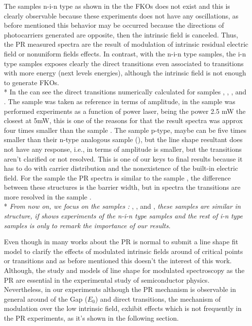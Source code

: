 The samples n-i-n type as shown in the  the FKOs does not exist and this is clearly observable because these experiments does not have any oscillations, as before mentioned this behavior may be occurred because the directions  of photocarriers generated are opposite, then the intrinsic field is canceled. Thus, the PR measured spectra are the result of modulation of intrinsic residual electric field or  nonuniform fields effects\cite{delsole1978effect}.  
In contrast,  with the n-i-n type samples, the i-n type samples exposes clearly the direct transitions even associated to transitions with more energy (next levels energies), although the intrinsic field is not enough to generate FKOs. \\*
In the  can see the direct transitions numerically calculated for samples , , ,  and . The sample  was taken as reference in terms of amplitude, in the sample  was performed experiments as a function of power laser, being the power 2.5 mW the closest at 5mW, this is one of the reasons for that the result spectra was approx four times smaller than the sample .   The sample  p-type, maybe can be five times smaller than their n-type analogous sample (), but the line shape resultant does not have any response, i.e., in terms of amplitude is smaller, but the transitions aren't clarified or not resolved. This is one of our keys to final results because it has to do with carrier distribution and the nonexistence of the built-in electric field. For the sample  the PR spectra is similar to the sample  , the difference between these structures is the barrier width, but in spectra the transitions are more resolved in the sample .  \\*
\emph{From now on, we focus on the samples :} , ,  and , \emph{these samples are similar in structure, if shows experiments of the n-i-n type samples and the rest of i-n type samples is only to remark the importance of our results. }

Even though in many works about the PR is normal to submit a line shape fit model  to clarify the effects of modulated intrinsic fields around of critical points or transitions and as before mentioned this doesn't the interest of this work. Although, the study and models of line shape for modulated spectroscopy as the PR are essential in the experimental study of semiconductor physics\cite{cardona1969modulation,seraphin1966bandstructure}.  Nevertheless, in our experiments  although the PR mechanism is observable in general around of the Gap ($E_0$) and direct transitions, the mechanism of modulation over the low intrinsic field, exhibit  effects  which is not frequently in the PR experiments, as it's shown in the following section. 


